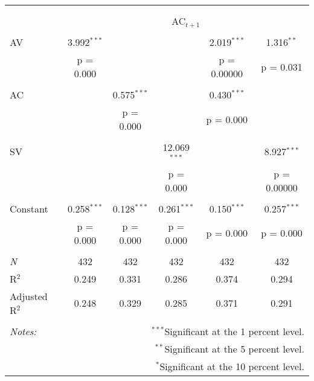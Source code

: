 
\begin{tabular}{@{\extracolsep{5pt}}lccccc} 
\\[-1.8ex]\hline 
\hline \\[-1.8ex] 
\\[-1.8ex] & \multicolumn{5}{c}{AC$_{t+1}$} \\ 
\hline \\[-1.8ex] 
 AV & 3.992$^{***}$ &  &  & 2.019$^{***}$ & 1.316$^{**}$ \\ 
  & p = 0.000 &  &  & p = 0.00000 & p = 0.031 \\ 
  & & & & & \\ 
 AC &  & 0.575$^{***}$ &  & 0.430$^{***}$ &  \\ 
  &  & p = 0.000 &  & p = 0.000 &  \\ 
  & & & & & \\ 
 SV &  &  & 12.069$^{***}$ &  & 8.927$^{***}$ \\ 
  &  &  & p = 0.000 &  & p = 0.00000 \\ 
  & & & & & \\ 
 Constant & 0.258$^{***}$ & 0.128$^{***}$ & 0.261$^{***}$ & 0.150$^{***}$ & 0.257$^{***}$ \\ 
  & p = 0.000 & p = 0.000 & p = 0.000 & p = 0.000 & p = 0.000 \\ 
  & & & & & \\ 
\textit{N} & 432 & 432 & 432 & 432 & 432 \\ 
R$^{2}$ & 0.249 & 0.331 & 0.286 & 0.374 & 0.294 \\ 
Adjusted R$^{2}$ & 0.248 & 0.329 & 0.285 & 0.371 & 0.291 \\ 
\hline 
\hline \\[-1.8ex] 
\textit{Notes:} & \multicolumn{5}{r}{$^{***}$Significant at the 1 percent level.} \\ 
 & \multicolumn{5}{r}{$^{**}$Significant at the 5 percent level.} \\ 
 & \multicolumn{5}{r}{$^{*}$Significant at the 10 percent level.} \\ 
\end{tabular} 

